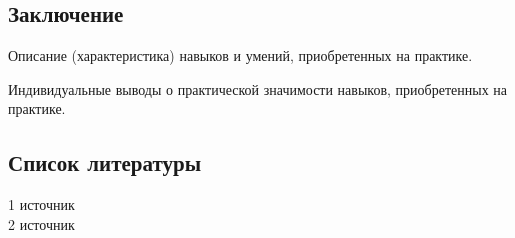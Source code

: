 \documentclass[a4paper,12pt]{article} %
\begin{document}
\begin{center}
\section*{Заключение}
\end{center}
\par Описание (характеристика) навыков и умений, приобретенных на практике. 
\par Индивидуальные выводы о практической значимости навыков, приобретенных на практике. 
\newpage
\setcounter{subsection}{0}
\setcounter{equation}{0}
\setcounter{section}{0}

\begin{center}
\section*{Список литературы}
\end{center}
1 источник \\
2 источник \\
\end{document}
